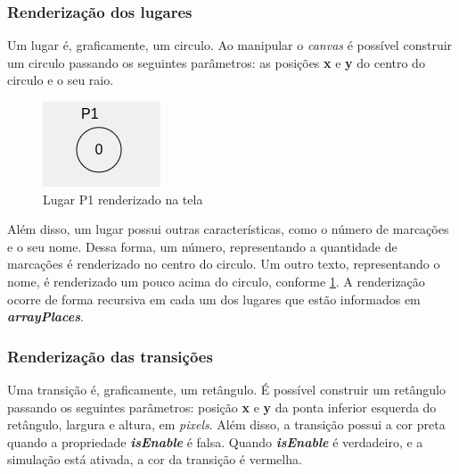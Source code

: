 \documentclass[
	12pt,				%
	openright,			%
	oneside,			%
	a4paper,			%
	english,			%
	brazil				%
	]{abntex2}
\begin{document}
\subsubsection*{Renderização dos lugares}

Um lugar é, graficamente, um circulo. Ao manipular o \textit{canvas} é possível construir um circulo passando os seguintes parâmetros: as posições \textbf{x} e \textbf{y} do centro do circulo e o seu raio. 



\begin{figure}[ht] 
	\centering
	\includegraphics[scale=1]{figuras/renderPlace.png}
	\caption[Lugar P1 renderizado na tela]{Lugar P1 renderizado na tela}
	\label{fig:renderPlace}
\end{figure}
\FloatBarrier

Além disso, um lugar possui outras características, como o número de marcações e o seu nome. Dessa forma, um número, representando a quantidade de marcações é renderizado no centro do circulo. Um outro texto, representando o nome, é renderizado um pouco acima do circulo, conforme \ref{fig:renderPlace}. A renderização ocorre de forma recursiva em cada um dos lugares que estão informados em \textbf{\textit{arrayPlaces}}.

\subsubsection*{Renderização das transições}

Uma transição é, graficamente, um retângulo. É possível construir um retângulo passando os seguintes parâmetros: posição \textbf{x} e \textbf{y} da ponta inferior esquerda do retângulo, largura e altura, em \textit{pixels}. Além disso, a transição possui a cor preta quando a propriedade \textbf{\textit{isEnable}} é falsa. Quando \textbf{\textit{isEnable}} é verdadeiro, e a simulação está ativada, a cor da transição é vermelha. 


\end{document}

